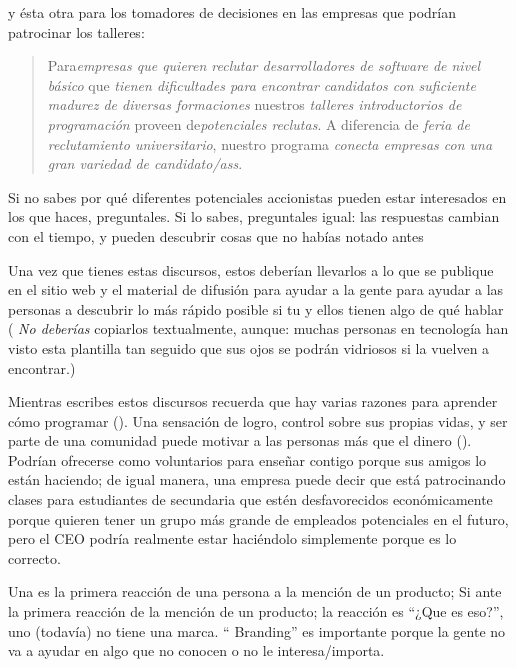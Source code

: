 \noindent
y ésta otra para los tomadores de decisiones en las empresas que podrían patrocinar los talleres:

\begin{quote}

 Para\emph{empresas que quieren reclutar desarrolladores de software de nivel básico}
  que \emph{ tienen dificultades para  encontrar candidatos con suficiente madurez  de diversas formaciones}
  nuestros \emph{ talleres introductorios de programación}
  proveen de\emph{potenciales reclutas}.
  A diferencia de \emph{ feria de reclutamiento universitario},
  nuestro programa \emph{ conecta empresas con una gran variedad de candidato/ass}.


\end{quote}

Si no sabes por qué diferentes potenciales accionistas pueden estar interesados en los que haces,
preguntales.
Si lo sabes,
preguntales igual:
las respuestas cambian con el tiempo,
y pueden descubrir cosas que no habías notado antes

Una vez que tienes estas discursos,
estos deberían llevarlos a lo que se publique en el sitio web y el material de difusión
para ayudar a la gente para ayudar a las personas a descubrir lo más rápido posible
si tu y ellos tienen algo de qué hablar
( \emph{No deberías} copiarlos textualmente,
aunque:
muchas personas en tecnología han visto esta plantilla tan seguido que 
sus ojos se podrán vidriosos si la vuelven a encontrar.)



Mientras escribes estos discursos
recuerda que hay varias razones para aprender cómo programar
().
Una sensación de logro,
control sobre sus propias vidas,
y ser parte de una comunidad puede motivar a las personas más que el dinero
().
Podrían ofrecerse como voluntarios para enseñar contigo  porque sus amigos lo están haciendo;
 de igual manera,
 una empresa puede decir que está patrocinando clases para estudiantes de secundaria que estén desfavorecidos económicamente
 porque quieren tener un grupo más grande de empleados potenciales en el futuro, 
 pero el CEO podría realmente estar haciéndolo simplemente porque es lo correcto.


Una  es la primera reacción de una persona a la mención de un producto;
Si ante la primera reacción de la mención de un producto;
la reacción es “¿Que es eso?”,
uno (todavía) no tiene una marca.
“ Branding” es importante porque
la gente no va a ayudar en algo que no conocen o no le interesa/importa.

